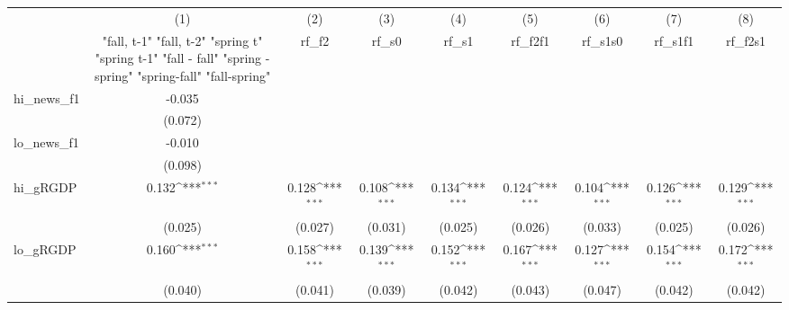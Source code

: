{
\def\sym#1{\ifmmode^{#1}\else\(^{#1}\)\fi}
\begin{tabular}{l*{8}{c}}
\toprule
            &\multicolumn{1}{c}{(1)}&\multicolumn{1}{c}{(2)}&\multicolumn{1}{c}{(3)}&\multicolumn{1}{c}{(4)}&\multicolumn{1}{c}{(5)}&\multicolumn{1}{c}{(6)}&\multicolumn{1}{c}{(7)}&\multicolumn{1}{c}{(8)}\\
            &\multicolumn{1}{c}{  "fall, t-1" "fall, t-2" "spring t" "spring t-1"  "fall - fall" "spring - spring" "spring-fall" "fall-spring" }&\multicolumn{1}{c}{rf\_f2}&\multicolumn{1}{c}{rf\_s0}&\multicolumn{1}{c}{rf\_s1}&\multicolumn{1}{c}{rf\_f2f1}&\multicolumn{1}{c}{rf\_s1s0}&\multicolumn{1}{c}{rf\_s1f1}&\multicolumn{1}{c}{rf\_f2s1}\\
\midrule
hi\_news\_f1  &      -0.035         &                     &                     &                     &                     &                     &                     &                     \\
            &     (0.072)         &                     &                     &                     &                     &                     &                     &                     \\
\addlinespace
lo\_news\_f1  &      -0.010         &                     &                     &                     &                     &                     &                     &                     \\
            &     (0.098)         &                     &                     &                     &                     &                     &                     &                     \\
\addlinespace
hi\_gRGDP    &       0.132\sym{***}&       0.128\sym{***}&       0.108\sym{***}&       0.134\sym{***}&       0.124\sym{***}&       0.104\sym{***}&       0.126\sym{***}&       0.129\sym{***}\\
            &     (0.025)         &     (0.027)         &     (0.031)         &     (0.025)         &     (0.026)         &     (0.033)         &     (0.025)         &     (0.026)         \\
\addlinespace
lo\_gRGDP    &       0.160\sym{***}&       0.158\sym{***}&       0.139\sym{***}&       0.152\sym{***}&       0.167\sym{***}&       0.127\sym{***}&       0.154\sym{***}&       0.172\sym{***}\\
            &     (0.040)         &     (0.041)         &     (0.039)         &     (0.042)         &     (0.043)         &     (0.047)         &     (0.042)         &     (0.042)         \\

\end{tabular}}
